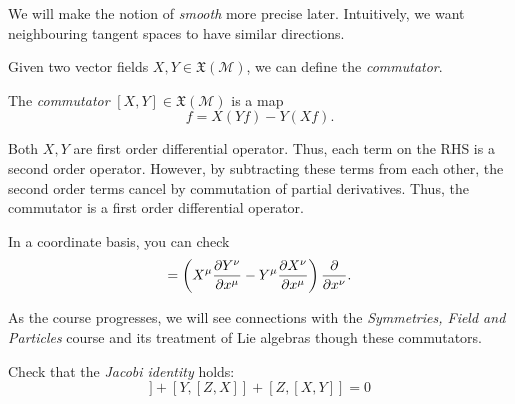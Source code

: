 \begin{leftbar}
  \begin{remark}
    We will make the notion of \emph{smooth} more precise later. Intuitively, we want neighbouring tangent spaces to have similar directions.
  \end{remark}
\end{leftbar}

Given two vector fields $X, Y \in \mathfrak{X}(\mathcal{M})$, we can define the \emph{commutator}.
\begin{definition}[commutator]
  The \emph{commutator} $[X, Y] \in \mathfrak{X}(\mathcal{M})$ is a map
  \begin{equation}
    [X, Y] f = X(Y f) - Y(Xf).
  \end{equation}
\end{definition}

\begin{leftbar}
  \begin{remark}
    Both $X, Y$ are first order differential operator. Thus, each term on the RHS is a second order operator. However, by subtracting these terms from each other, the second order terms cancel by commutation of partial derivatives.
    Thus, the commutator is a first order differential operator.
  \end{remark}
\end{leftbar}

\begin{exercise}[]
In a coordinate basis, you can check
\begin{equation}
  [X, Y] = \left( X^\mu \pdv{Y^\nu}{x^\mu} - Y^\mu \pdv{X^\nu}{x^\mu} \right) \pdv{}{x^\nu}.
\end{equation}
\end{exercise}

\begin{leftbar}
  \begin{remark}
    As the course progresses, we will see connections with the \emph{Symmetries, Field and Particles} course and its treatment of Lie algebras though these commutators.
  \end{remark}
\end{leftbar}

\begin{exercise}
  Check that the \emph{Jacobi identity} holds:
  \begin{equation}
    [X, [Y, Z] ] + [Y, [Z, X] ] +  [Z, [X, Y] ] = 0
  \end{equation}
\end{exercise}

